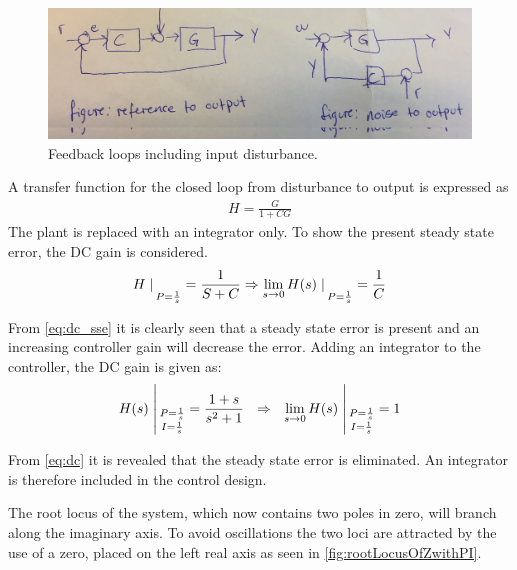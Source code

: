 \begin{figure}[H]
	\centering
	\includegraphics[width=.6\textwidth]{figures/inputdisturbance.png}
	\caption{Feedback loops including input disturbance.}
	\label{fig:rootLocusOfZwithPI}
\end{figure}
A transfer function for the closed loop from disturbance to output is expressed as
\begin{align}
H=\frac{G}{1+CG}
\end{align}  
The plant is replaced with an integrator only. To show the present steady state error, the DC gain is considered.
\begin{align}
H\oleStreg{P=\frac{1}{s}}=\frac{1}{S+C} \Rightarrow \lim_{s \to 0} H(s)\oleStreg{P=\frac{1}{s}}= \frac{1}{C} \label{eq:dc_sse}
\end{align}
\begin{where}
\end{where}

From \autoref{eq:dc_sse} it is clearly seen that a steady state error is present and an increasing controller gain will decrease the error.
Adding an integrator to the controller, the DC gain is given as:
\begin{align}
H(s)\oleStregTwo{P=\frac{1}{s}}{I=\frac{1}{s}} =\frac{1+s}{s^2+1} \ \ \Rightarrow\ \  \lim_{s \to 0} H(s)\oleStregTwo{P=\frac{1}{s}}{I=\frac{1}{s}} = 1 \label{eq:dc}
\end{align}
\begin{where}
\end{where}

From \autoref{eq:dc} it is revealed that the steady state error is eliminated. 
An integrator is therefore included in the control design. 

The root locus of the system, which now contains two poles in zero, will branch along the imaginary axis. To avoid oscillations the two loci are attracted by the use of a zero, placed on the left real axis as seen in \autoref{fig:rootLocusOfZwithPI}.

